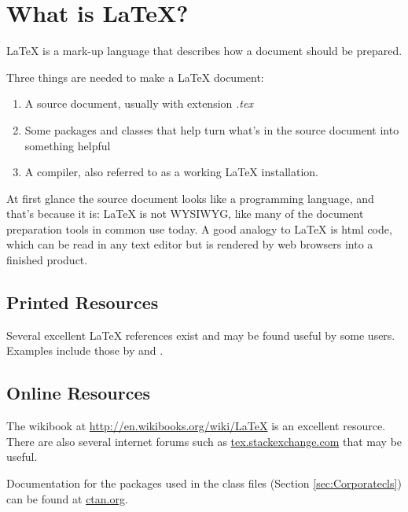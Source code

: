 \section{What is LaTeX?}
LaTeX is a mark-up language that describes how a document should be prepared.

Three things are needed to make a LaTeX document:
\begin{enumerate}
\item A source document, usually with extension \emph{.tex}
\item Some packages and classes that help turn what's in the source document into something helpful
\item A compiler, also referred to as a working LaTeX installation.
\end{enumerate}

At first glance the source document looks like a programming language, and that's because it is: LaTeX is not WYSIWYG, like many of the document preparation tools in common use today. A good analogy to LaTeX is html code, which can be read in any text editor but is rendered by web browsers into a finished product.

\subsection{Printed Resources}
Several excellent LaTeX references exist and may be found useful by some users. Examples include those by \citet{Knuth_1984_a} and \citet{Lamport_1986_a}.

\subsection{Online Resources}
The wikibook at \href{http://en.wikibooks.org/wiki/LaTeX}{http://en.wikibooks.org/wiki/LaTeX} is an excellent resource. There are also several internet forums such as \href{tex.stackexchange.com}{tex.stackexchange.com} that may be useful.

Documentation for the packages used in the class files (Section \ref{sec:Corporatecls}) can be found at \href{ctan.org}{ctan.org}.
